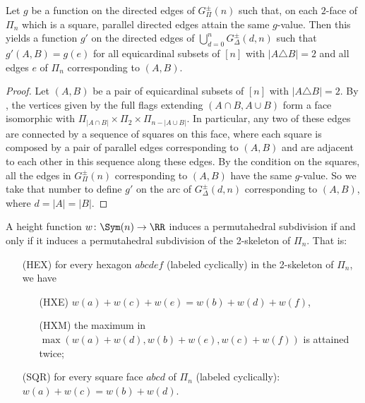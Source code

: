 \begin{lemma} \label{lem:squares-function}
  Let $g$ be a function on the directed edges of $G^\pm_{\Pi}(n)$ such that, on each $2$-face of $\Pi_n$ which is a square, parallel directed edges attain the same $g$-value.
  Then this yields a function $g'$ on the directed edges of $\bigcup_{d=0}^{n} G^\pm_{\Delta}(d,n)$ such that $g'(A,B) = g(e)$ for all equicardinal subsets of $[n]$ with $|A \triangle B| = 2$ and all edges $e$ of $\Pi_n$ corresponding to $(A,B)$. 
\end{lemma}
\begin{proof}
  Let $(A,B)$ be a pair of equicardinal subsets of $[n]$ with $|A \triangle B| = 2$.
  By , the vertices given by the full flags extending $(A \cap B, A \cup B)$ form a face isomorphic with $\Pi_{|A \cap B|} \times \Pi_{2} \times \Pi_{n - |A \cup B|}$.
	In particular, any two of these edges are connected by a sequence of squares on this face, where each square is composed by a pair of parallel edges corresponding to $(A,B)$ and are adjacent to each other in this sequence along these edges.
  By the condition on the squares, all the edges in $G^\pm_{\Pi}(n)$ corresponding to $(A,B)$ have the same $g$-value.
  So we take that number to define $g'$ on the arc of $G^\pm_{\Delta}(d,n)$ corresponding to $(A,B)$, where $d = |A| = |B|$.
\end{proof}



\begin{theorem}
	\label{thm:regular-2-skeleton}
	A height function $w \colon \Sym(n) \to \RR$ induces a permutahedral subdivision if and only if it induces a permutahedral subdivision of the 2-skeleton of $\Pi_n$. That is:
	\begin{enumerate}[leftmargin=*, widest=XXXX]
		\item[(HEX)] for every hexagon $abcdef$ (labeled cyclically) in the 2-skeleton of $\Pi_n$, we have
		\begin{enumerate}
			\item[(HXE)] $w(a)+w(c)+w(e) = w(b)+w(d)+w(f)$, 
			\item[(HXM)] the maximum in $\max(w(a)+w(d), w(b)+w(e), w(c)+w(f))$ is attained twice;
		\end{enumerate}
		\item[(SQR)] for every square face $abcd$ of $\Pi_n$ (labeled cyclically): $w(a)+w(c) = w(b)+w(d)$.
	\end{enumerate}
\end{theorem}

